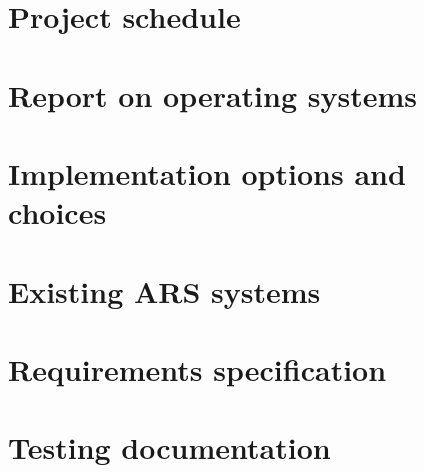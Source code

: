\documentclass[a4papert,11pt,notitlepage]{article}
\begin{document}
\begin{appendices}
\appendixpage
\addappheadtotoc
\section{Project schedule}
\label{app:schedule}

\section{Report on operating systems}
\label{app:osreport}

\section{Implementation options and choices}
\label{app:implementationoptions}

\section{Existing ARS systems}
\label{app:existingars}

\section{Requirements specification}
\label{app:requirements}

\section{Testing documentation}
\label{app:testing}
\end{appendices}
\end{document}
